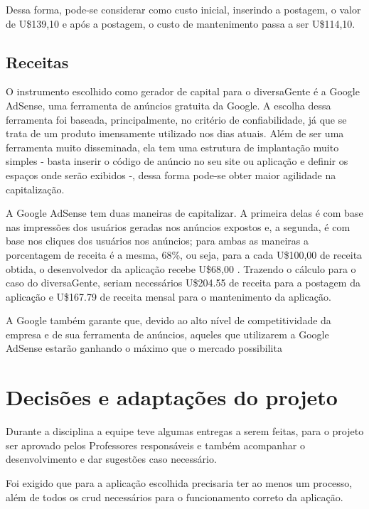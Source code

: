 Dessa forma, pode-se considerar como custo inicial, inserindo a postagem, o valor de U\$139,10 e após a postagem, o custo de mantenimento passa a ser U\$114,10.

\subsection{Receitas}

O instrumento escolhido como gerador de capital para o diversaGente é a Google AdSense, uma ferramenta de anúncios gratuita da Google. A escolha dessa ferramenta foi baseada, principalmente, no critério de confiabilidade, já que se trata de um produto imensamente utilizado nos dias atuais. Além de ser uma ferramenta muito disseminada, ela tem uma estrutura de implantação muito simples - basta inserir o código de anúncio no seu site ou aplicação e definir os espaços onde serão exibidos -, dessa forma pode-se obter maior agilidade na capitalização.




A Google AdSense tem duas maneiras de capitalizar. A primeira delas é com base nas impressões dos usuários geradas nos anúncios expostos e, a segunda, é com base nos cliques dos usuários nos anúncios; para ambas as maneiras a porcentagem de receita é a mesma, 68\%, ou seja, para a cada U\$100,00 de receita obtida, o desenvolvedor da aplicação recebe U\$68,00  \cite{googleadsense}. Trazendo o cálculo para o caso do diversaGente, seriam necessários U\$204.55 de receita para a postagem da aplicação e U\$167.79 de receita mensal para o mantenimento da aplicação.

A Google também garante que, devido ao alto nível de competitividade da empresa e de sua ferramenta de anúncios, aqueles que utilizarem a Google AdSense estarão ganhando o máximo que o mercado possibilita


\section{Decisões e adaptações do projeto}

Durante a disciplina a equipe teve algumas entregas a serem feitas, para o projeto ser aprovado pelos Professores responsáveis e também acompanhar o desenvolvimento e dar sugestões caso necessário. 

Foi exigido que para a aplicação escolhida precisaria ter ao menos um processo, além de todos os \ac{crud} necessários para o funcionamento correto da aplicação.

